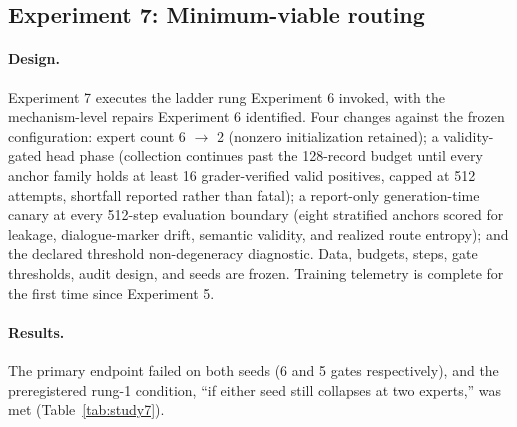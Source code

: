 \documentclass[10pt,a4paper]{article}
\begin{document}
\subsection{Experiment 7: Minimum-viable routing}
\label{sec:study7}

\paragraph{Design.}
Experiment 7 executes the ladder rung Experiment 6 invoked, with the mechanism-level
repairs Experiment 6 identified. Four changes against the frozen configuration:
expert count 6 $\rightarrow$ 2 (nonzero initialization retained); a
validity-gated head phase (collection continues past the 128-record budget
until every anchor family holds at least 16 grader-verified valid positives,
capped at 512 attempts, shortfall reported rather than fatal); a report-only
generation-time canary at every 512-step evaluation boundary (eight
stratified anchors scored for leakage, dialogue-marker drift, semantic
validity, and realized route entropy); and the declared threshold
non-degeneracy diagnostic. Data, budgets, steps, gate thresholds, audit
design, and seeds are frozen. Training telemetry is complete for the first
time since Experiment 5.

\paragraph{Results.}
The primary endpoint failed on both seeds (6 and 5 gates respectively), and
the preregistered rung-1 condition, ``if either seed still collapses at
two experts,'' was met (Table~\ref{tab:study7}).
\end{document}
